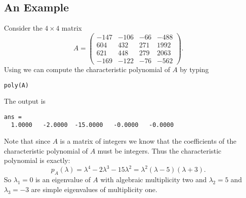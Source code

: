 \documentclass{ximera}
\begin{document}
\subsection*{An Example}

Consider the $4\times 4$ matrix
\begin{equation*} \label{e:Aexamp}
A=\left(\begin{array}{rrrr}      -147  &  -106      &   -66     &   -488\\
         604   &      432      &   271     &   1992\\
         621   &      448       &  279     &   2063\\
        -169    &    -122      &   -76     &   -562\end{array}\right).
\end{equation*}
Using \Matlab we can compute the characteristic polynomial of $A$
by typing
\begin{verbatim}
poly(A)
\end{verbatim}
The output is
\begin{verbatim}
ans =
  1.0000   -2.0000  -15.0000   -0.0000   -0.0000
\end{verbatim}
Note that since $A$ is a matrix of integers we know that the coefficients 
of the characteristic polynomial of $A$ must be integers.   Thus the 
characteristic polynomial is exactly:
\[
p_A(\lambda) = \lambda^4-2\lambda^3-15\lambda^2 =
	\lambda^2(\lambda-5)(\lambda+3).
\]
So $\lambda_1=0$ is an eigenvalue of $A$ with 
algebraic multiplicity two
and $\lambda_2=5$ and $\lambda_3=-3$ are simple eigenvalues of 
multiplicity one.
\end{document}
